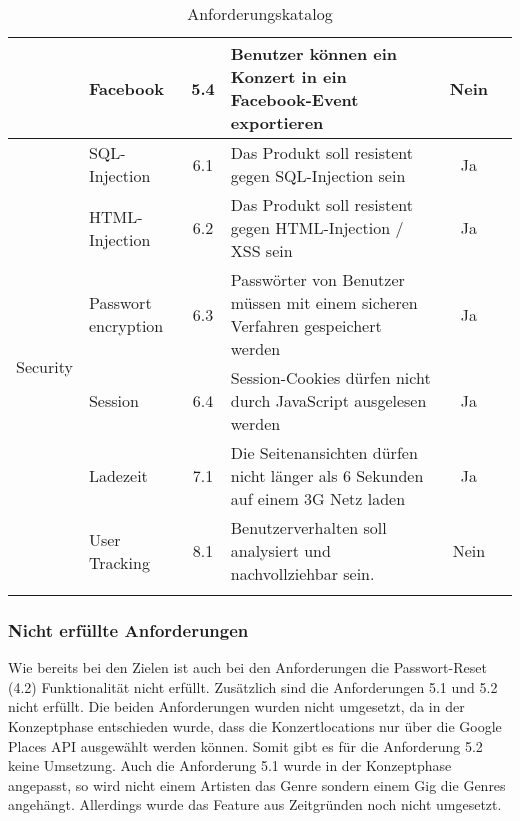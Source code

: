 \begin{longtable}[]{@{}p{1.9cm}p{2.5cm}cp{5.5cm}cc@{}}
                             & Facebook                   & 5.4          & Benutzer können ein Konzert in ein Facebook-Event exportieren                                               & Nein                            \\
  \midrule
  \multirow{9}{*}{Security}  & SQL-Injection              & 6.1          & Das Produkt soll resistent gegen SQL-Injection sein                                                         & Ja                              \\ \cline{2-6}
                             & HTML-Injection             & 6.2          & Das Produkt soll resistent gegen HTML-Injection / XSS sein                                                  & Ja                              \\ \cline{2-6}
                             & Passwort encryption        & 6.3          & Passwörter von Benutzer müssen mit einem sicheren Verfahren gespeichert werden                              & Ja                              \\ \cline{2-6}
                             & Session                    & 6.4          & Session-Cookies dürfen nicht durch JavaScript ausgelesen werden                                             & Ja                              \\
  \midrule
  Performance                & Ladezeit                   & 7.1          & Die Seitenansichten dürfen nicht länger als 6 Sekunden auf einem 3G Netz laden                              & Ja                              \\
  \midrule
  Sonstiges                  & User Tracking              & 8.1          & Benutzerverhalten soll analysiert und nachvollziehbar sein.                                                 & Nein                            \\
  \bottomrule
  \caption{Anforderungskatalog}
\end{longtable}

\subsubsection{Nicht erfüllte Anforderungen}

Wie bereits bei den Zielen ist auch bei den Anforderungen die Passwort-Reset (4.2)
Funktionalität nicht erfüllt.
Zusätzlich sind die Anforderungen 5.1 und 5.2 nicht erfüllt. Die beiden
Anforderungen wurden nicht umgesetzt, da in der Konzeptphase entschieden wurde,
dass die Konzertlocations nur über die Google Places API ausgewählt werden können.
Somit gibt es für die Anforderung 5.2 keine Umsetzung.
Auch die Anforderung 5.1 wurde in der Konzeptphase angepasst, so wird nicht einem
Artisten das Genre sondern einem Gig die Genres angehängt. Allerdings wurde das
Feature aus Zeitgründen noch nicht umgesetzt.
